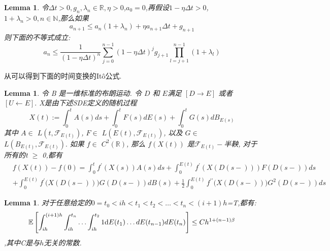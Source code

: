 \documentclass[12pt,final]{article}
\numberwithin{equation}{section}
\numberwithin{figure}{section}
\numberwithin{table}{section}
\theoremstyle{plain}
\newtheorem{Lemma}[Theorem]{Lemma}      %
\theoremstyle{Definition}
\theoremstyle{Remark}
\begin{document}
	\begin{Lemma}\label{Lemma:1}
		令$\Delta t > 0,g_n,\lambda _n \in \mathbb{R},\eta > 0$,$a_0=0$,再假设$1-\eta \Delta t > 0$,$1 + \lambda _n > 0,n \in \mathbb{N}$,那么如果
		\begin{equation*}
			a_{n+1} \leq a_n(1+\lambda _n)+\eta a_{n+1}\Delta t +g_{n+1}
		\end{equation*}
		则下面的不等式成立:
		\begin{equation}
			a_n \leq \frac{1}{(1-\eta\Delta t)^n}\sum\limits_{j=0}^{n-1}(1-\eta\Delta t)^jg_{j+1}\prod\limits_{l=j+1}^{n-1}(1+\lambda _l)
		\end{equation}
	\end{Lemma}
	
	
	从\cite{umarov2018beyond}可以得到下面的时间变换的It\^{o}公式.
	\begin{Lemma}\label{ito}
		令 B 是一维标准的布朗运动. 令 $D$ 和 $E$满足 $[ D\longrightarrow E]$ 或者 $[ U\longleftarrow E].$ X是由下述\textnormal{SDE}定义的随机过程
		$$X{(t)}:=\int_0^tA{(s)}ds+\int_0^tF{(s)}dE{(s)}+\int_0^tG{(s)}dB_{E{(s)}}$$
		其中 $A\in$ $L( t, \mathcal{F} _{E{(t)}})$, $F\in$ $L( E{(t)}, \mathcal{F} _{E{(t)}})$, 以及 $G\in$ $L( B_{E{(t)}}, \mathcal{F} _{E{(t)}}) .$ 如果 $f\in$ $C^2( \mathbb{R} )$, 那么
		$f(X(t))$ 是$\mathcal{F}_{E{(t)}}-$半鞅, 对于所有的t $\ge$ 0,都有
		$$\begin{aligned}
			&f(X{(t)})-f(0)=\int_{0}^{t}f^{\prime}(X{(s)})A{(s)}ds+\int_{0}^{E{(t)}}f^{\prime}\left(X(D(s-))\right)F(D(s-))ds\\
			&+\int_{0}^{E{(t)}}f^{\prime}\big(X(D(s-))\big)G(D(s-))dB{(s)}+\frac{1}{2}\int_{0}^{E{(t)}}f^{\prime\prime}\big(X(D(s-))\big)G^2(D(s-))ds
		\end{aligned}$$
	\end{Lemma}
	
	
	\begin{Lemma}\label{Lemma:2}
		对于任意给定的$0 = t_0 < ih < t_1 < t_2 < \ldots <t_n <(i+1)h$=T,都有:
		\begin{equation}
			\mathbb{E}\left[\int_{ih}^{(i+1)h}
			\int_{ih}^{t_n} \ldots \int_{ih}^{t_2} 1 \textnormal{d}E({t_1}) \ldots dE({t_{n-1}})dE({t_n})\right] \le Ch^{1+(n-1)\beta}
		\end{equation}
		,其中C是与$h$无关的常数.
	\end{Lemma}
	
\end{document}

